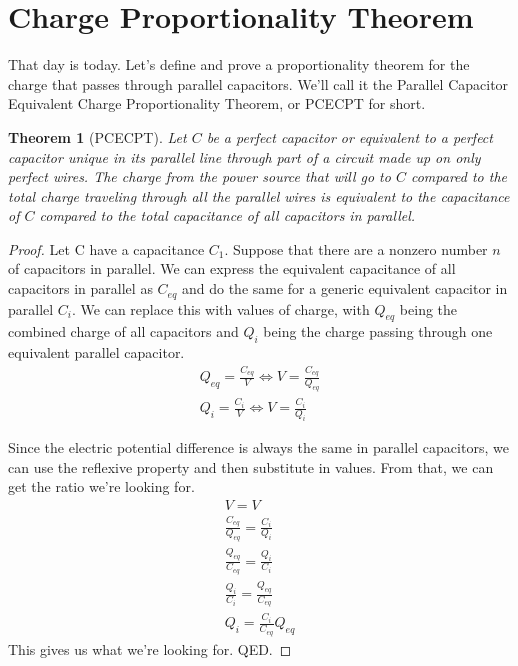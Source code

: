 \documentclass[12pt]{article}
\newtheorem{theorem}{Theorem}
\begin{document}
\section*{Charge Proportionality Theorem}
That day is today. Let's define and prove a proportionality theorem for the charge that passes through parallel capacitors.
We'll call it the Parallel Capacitor Equivalent Charge Proportionality Theorem, or PCECPT for short.
\begin{theorem}[PCECPT]
    Let $C$ be a perfect capacitor or equivalent to a perfect capacitor unique in its parallel line through part of a circuit made up on only perfect wires.
    The charge from the power source that will go to $C$ compared to the total charge traveling through all the parallel wires is equivalent to the capacitance of $C$ compared to the total capacitance of all capacitors in parallel.
\end{theorem}
\begin{proof}
    Let C have a capacitance $C_1$.
    Suppose that there are a nonzero number $n$ of capacitors in parallel. 
    We can express the equivalent capacitance of all capacitors in parallel as $C_{eq}$ and do the same for a generic equivalent capacitor in parallel $C_i$.
    We can replace this with values of charge, with $Q_{eq}$ being the combined charge of all capacitors and $Q_i$ being the charge passing through one equivalent parallel capacitor.
    \begin{gather*}
        Q_{eq} = \frac{C_{eq}}{V}   \Leftrightarrow V = \frac{C_{eq}}{Q_{eq}}\\
        Q_i =   \frac{C_i}{V}       \Leftrightarrow V = \frac{C_i}{Q_i}
    \end{gather*}

    Since the electric potential difference is always the same in parallel capacitors, we can use the reflexive property and then substitute in values.
    From that, we can get the ratio we're looking for.
    \begin{gather*}
        V   =   V\\
        \frac{C_{eq}}{Q_{eq}}   =   \frac{C_i}{Q_i}\\
        \frac{Q_{eq}}{C_{eq}}   =   \frac{Q_i}{C_i}\\
        \frac{Q_i}{C_i}         =   \frac{Q_{eq}}{C_{eq}}\\
        Q_i =   \frac{C_i}{C_{eq}}Q_{eq}
    \end{gather*}
    This gives us what we're looking for. QED.
\end{proof}
\end{document}
